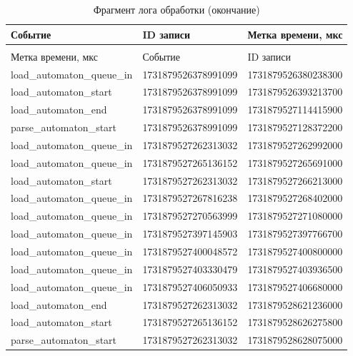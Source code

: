 \begin{longtable}{|p{}|p{}|p{}|}
    \caption{Фрагмент лога обработки (начало)}\label{tbl:b_log}
    \\
    \hline
    Событие & ID записи             & Метка времени, мкс \\
    \hline
    \endfirsthead
    \caption{Фрагмент лога обработки (окончание)}
    \\
    \hline
    Метка времени, мкс   & Событие    & ID записи     \\
    \hline
    \endhead
    \hline
    \endfoot
    \endlastfoot
    \hline
	load\_automaton\_queue\_in & 1731879526378991099 & 1731879526380238300 \\ \hline
	load\_automaton\_start & 1731879526378991099 & 1731879526393213700 \\ \hline
	load\_automaton\_end & 1731879526378991099 & 1731879527114415900 \\ \hline
	parse\_automaton\_start & 1731879526378991099 & 1731879527128372200 \\ \hline
	load\_automaton\_queue\_in & 1731879527262313032 & 1731879527262992000 \\ \hline
	load\_automaton\_queue\_in & 1731879527265136152 & 1731879527265691000 \\ \hline
	load\_automaton\_start & 1731879527262313032 & 1731879527266213000 \\ \hline
	load\_automaton\_queue\_in & 1731879527267816238 & 1731879527268402000 \\ \hline
	load\_automaton\_queue\_in & 1731879527270563999 & 1731879527271080000 \\ \hline
	load\_automaton\_queue\_in & 1731879527397145903 & 1731879527397766700 \\ \hline
	load\_automaton\_queue\_in & 1731879527400048572 & 1731879527400800000 \\ \hline
	load\_automaton\_queue\_in & 1731879527403330479 & 1731879527403936500 \\ \hline
	load\_automaton\_queue\_in & 1731879527406050933 & 1731879527406680000 \\ \hline
	load\_automaton\_end & 1731879527262313032 & 1731879528621236000 \\ \hline
	load\_automaton\_start & 1731879527265136152 & 1731879528626275800 \\ \hline
	parse\_automaton\_start & 1731879527262313032 & 1731879528628075000 \\ \hline

\end{longtable}
